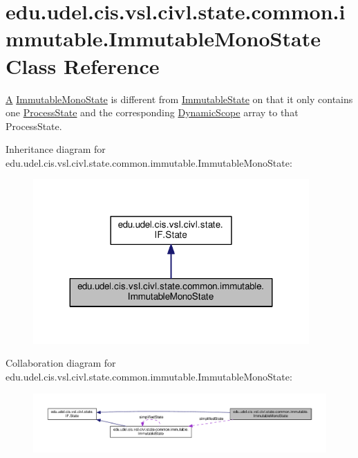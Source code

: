 \hypertarget{classedu_1_1udel_1_1cis_1_1vsl_1_1civl_1_1state_1_1common_1_1immutable_1_1ImmutableMonoState}{}\section{edu.\+udel.\+cis.\+vsl.\+civl.\+state.\+common.\+immutable.\+Immutable\+Mono\+State Class Reference}
\label{classedu_1_1udel_1_1cis_1_1vsl_1_1civl_1_1state_1_1common_1_1immutable_1_1ImmutableMonoState}


\hyperlink{structA}{A} \hyperlink{classedu_1_1udel_1_1cis_1_1vsl_1_1civl_1_1state_1_1common_1_1immutable_1_1ImmutableMonoState}{Immutable\+Mono\+State} is different from \hyperlink{classedu_1_1udel_1_1cis_1_1vsl_1_1civl_1_1state_1_1common_1_1immutable_1_1ImmutableState}{Immutable\+State} on that it only contains one \hyperlink{}{Process\+State} and the corresponding \hyperlink{}{Dynamic\+Scope} array to that Process\+State.  




Inheritance diagram for edu.\+udel.\+cis.\+vsl.\+civl.\+state.\+common.\+immutable.\+Immutable\+Mono\+State\+:
\nopagebreak
\begin{figure}[H]
\begin{center}
\leavevmode
\includegraphics[width=299pt]{classedu_1_1udel_1_1cis_1_1vsl_1_1civl_1_1state_1_1common_1_1immutable_1_1ImmutableMonoState__inherit__graph}
\end{center}
\end{figure}


Collaboration diagram for edu.\+udel.\+cis.\+vsl.\+civl.\+state.\+common.\+immutable.\+Immutable\+Mono\+State\+:
\nopagebreak
\begin{figure}[H]
\begin{center}
\leavevmode
\includegraphics[width=350pt]{classedu_1_1udel_1_1cis_1_1vsl_1_1civl_1_1state_1_1common_1_1immutable_1_1ImmutableMonoState__coll__graph}
\end{center}
\end{figure}
